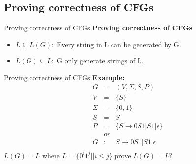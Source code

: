 \documentclass{beamer}
\begin{document}
\subsection{Proving correctness of CFGs}
\begin{frame}{Proving correctness of CFGs}
\textbf{Proving correctness of CFGs}
\begin{itemize}
	\item $L \subseteq L(G ):$ Every string in L can be generated by G.
	\item $L(G) \subseteq L:$ G only generate strings of L.
\end{itemize}
\end{frame}
\begin{frame}{Proving correctness of CFGs}
\textbf{	Example: }
\begin{eqnarray*}
		G &=& (V, \Sigma, S, P) \\
	V &=& \{S\} \\
	\Sigma &=& \{0, 1\}\\ 
	S &=& S \\
	P &=& \{S \rightarrow 0S1 | S1 | \epsilon\}\\ 
	&or&\\ 
	G&:& S \rightarrow 0S1 | S1 | \epsilon \\
\end{eqnarray*}
$L(G) = L$ where $L = \{ 0^i1^j\big|\big|i\leq j\}$  prove $L(G) = L?$
\end{frame}
\end{document}
